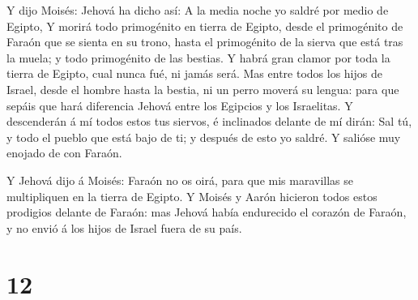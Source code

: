  Y dijo Moisés: Jehová ha dicho así: A la media noche yo
saldré por medio de Egipto,  Y morirá todo primogénito en
tierra de Egipto, desde el primogénito de Faraón que se sienta en su
trono, hasta el primogénito de la sierva que está tras la muela; y todo
primogénito de las bestias.  Y habrá gran clamor por toda la
tierra de Egipto, cual nunca fué, ni jamás será.  Mas entre
todos los hijos de Israel, desde el hombre hasta la bestia, ni un perro
moverá su lengua: para que sepáis que hará diferencia Jehová entre los
Egipcios y los Israelitas.  Y descenderán á mí todos estos
tus siervos, é inclinados delante de mí dirán: Sal tú, y todo el pueblo
que está bajo de ti; y después de esto yo saldré. Y salióse muy enojado
de con Faraón.

 Y Jehová dijo á Moisés: Faraón no os oirá, para que mis
maravillas se multipliquen en la tierra de Egipto.  Y
Moisés y Aarón hicieron todos estos prodigios delante de Faraón: mas
Jehová había endurecido el corazón de Faraón, y no envió á los hijos de
Israel fuera de su país.

\hypertarget{section-11}{%
\section{12}\label{section-11}}

